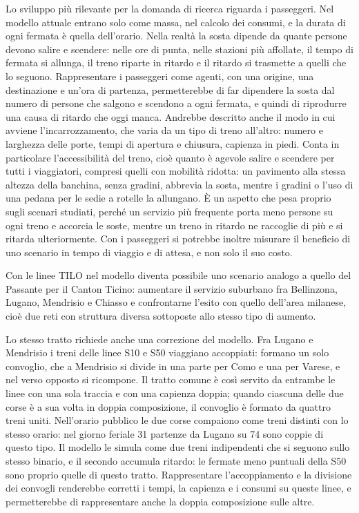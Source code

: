 Lo sviluppo più rilevante per la domanda di ricerca riguarda i passeggeri. Nel modello attuale entrano solo come massa, nel calcolo dei consumi, e la durata di ogni fermata è quella dell'orario. Nella realtà la sosta dipende da quante persone devono salire e scendere: nelle ore di punta, nelle stazioni più affollate, il tempo di fermata si allunga, il treno riparte in ritardo e il ritardo si trasmette a quelli che lo seguono. Rappresentare i passeggeri come agenti, con una origine, una destinazione e un'ora di partenza, permetterebbe di far dipendere la sosta dal numero di persone che salgono e scendono a ogni fermata, e quindi di riprodurre una causa di ritardo che oggi manca. Andrebbe descritto anche il modo in cui avviene l'incarrozzamento, che varia da un tipo di treno all'altro: numero e larghezza delle porte, tempi di apertura e chiusura, capienza in piedi. Conta in particolare l'accessibilità del treno, cioè quanto è agevole salire e scendere per tutti i viaggiatori, compresi quelli con mobilità ridotta: un pavimento alla stessa altezza della banchina, senza gradini, abbrevia la sosta, mentre i gradini o l'uso di una pedana per le sedie a rotelle la allungano. È un aspetto che pesa proprio sugli scenari studiati, perché un servizio più frequente porta meno persone su ogni treno e accorcia le soste, mentre un treno in ritardo ne raccoglie di più e si ritarda ulteriormente. Con i passeggeri si potrebbe inoltre misurare il beneficio di uno scenario in tempo di viaggio e di attesa, e non solo il suo costo.

Con le linee TILO nel modello diventa possibile uno scenario analogo a quello del Passante per il Canton Ticino: aumentare il servizio suburbano fra Bellinzona, Lugano, Mendrisio e Chiasso e confrontarne l'esito con quello dell'area milanese, cioè due reti con struttura diversa sottoposte allo stesso tipo di aumento.

Lo stesso tratto richiede anche una correzione del modello. Fra Lugano e Mendrisio i treni delle linee S10 e S50 viaggiano accoppiati: formano un solo convoglio, che a Mendrisio si divide in una parte per Como e una per Varese, e nel verso opposto si ricompone. Il tratto comune è così servito da entrambe le linee con una sola traccia e con una capienza doppia; quando ciascuna delle due corse è a sua volta in doppia composizione, il convoglio è formato da quattro treni uniti. Nell'orario pubblico le due corse compaiono come treni distinti con lo stesso orario: nel giorno feriale 31 partenze da Lugano su 74 sono coppie di questo tipo. Il modello le simula come due treni indipendenti che si seguono sullo stesso binario, e il secondo accumula ritardo: le fermate meno puntuali della S50 sono proprio quelle di questo tratto. Rappresentare l'accoppiamento e la divisione dei convogli renderebbe corretti i tempi, la capienza e i consumi su queste linee, e permetterebbe di rappresentare anche la doppia composizione sulle altre.

